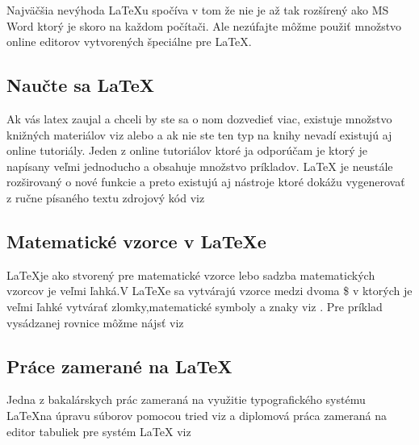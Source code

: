 \documentclass[11pt, a4paper]{article}
\begin{document}
Najväčšia nevýhoda \LaTeX u spočíva v tom že nie je až tak rozšírený ako MS Word ktorý je skoro na každom počítači. Ale nezúfajte môžme použiť množstvo online editorov vytvorených špeciálne pre \LaTeX.

\subsection{Naučte sa \LaTeX}

Ak vás latex zaujal a chceli by ste sa o nom dozvedieť viac, existuje množstvo knižných materiálov viz \cite{Rybicka2003} alebo \cite{LaTeX2004} a ak nie ste ten typ na knihy nevadí existujú aj online tutoriály. Jeden z online tutoriálov ktoré ja odporúčam je \cite{LearnLATEX} ktorý je napísany veľmi jednoducho a obsahuje množstvo príkladov.
 \LaTeX 
 je neustále rozširovaný o nové funkcie a preto existujú aj nástroje ktoré dokážu vygenerovať z ručne písaného textu zdrojový kód viz \cite{Oksuz2008}


\subsection{Matematické vzorce v \LaTeX e}

\LaTeX je ako stvorený pre matematické vzorce lebo sadzba matematických vzorcov je veľmi ľahká.V \LaTeX e sa vytvárajú vzorce medzi dvoma \$ v ktorých je veľmi ľahké vytvárať zlomky,matematické symboly a znaky viz \cite{Olsak2014}.
Pre príklad vysádzanej rovnice môžme nájsť viz \cite{CazarezCastro2012}




\subsection{Práce zamerané na \LaTeX}
Jedna z bakalárskych prác zameraná na využitie typografického systému \LaTeX na úpravu súborov pomocou tried viz \cite{Hasik2017} a diplomová práca zameraná na editor tabuliek pre systém LaTeX viz \cite{Simovic2015}

	\newpage
	
	\renewcommand{\refname}{Literatura}
	
\end{document}
